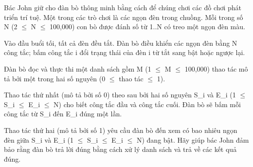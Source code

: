 Bác John giữ cho đàn bò thông minh bằng cách để chúng chơi các đồ chơi phát triển trí tuệ. Một trong các trò chơi là các ngọn đèn trong chuồng. Mỗi trong số N (2  $\le$  N  $\le$  100,000) con bò được đánh số từ 1..N có treo một ngọn đèn màu.  

   Vào đầu buổi tối, tất cả đèn đều tắt. Đàn bò điều khiển các ngọn đèn bằng N công tắc; bấm công tắc i đổi trạng thái của đèn i từ tắt sang bật hoặc ngược lại.  

   Đàn bò đọc và thực thi một danh sách gồm M (1  $\le$  M  $\le$  100,000) thao tác mô tả bởi một trong hai số nguyên (0  $\le$  thao tác  $\le$  1).  

   Thao tác thứ nhất (mô tả bởi số 0) theo sau bởi hai số nguyên S\_i và E\_i (1  $\le$  S\_i  $\le$  E\_i  $\le$  N) cho biết công tắc đầu và công tắc cuối. Đàn bò sẽ bấm mỗi công tắc từ S\_i đến E\_i đúng một lần.  

   Thao tác thứ hai (mô tả bởi số 1) yêu cầu đàn bò đến xem có bao nhiêu ngọn đèn giữa S\_i và E\_i (1  $\le$  S\_i  $\le$  E\_i  $\le$  N) đang bật. Hãy giúp bác John đảm bảo rằng đàn bò trả lời đúng bằng cách xử lý danh sách và trả về các kết quả đúng.